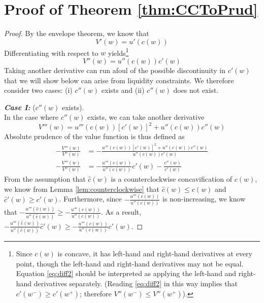 \documentclass[titlepage]{\econtex}
\begin{document}
\section{Proof of Theorem \ref{thm:CCToPrud}} \label{app:CCToPrud}
\begin{proof}
	By the envelope theorem, we know that 
	\[ V'(w) = u'(c(w))\]
	Differentiating with respect to $w$ yields\footnote{Since $c(w)$ is concave, it has left-hand and right-hand derivatives at every point, though the left-hand and right-hand derivatives may not be equal. Equation \eqref{eq:diff2} should be interpreted as applying the left-hand and right-hand derivatives separately. (Reading \eqref{eq:diff2} in this way implies that $c'(w^-) \geq c'(w^+)$; therefore $V''(w^-) \leq V''(w^+)$).}
	\begin{equation}\label{eq:diff2}
	V''(w) = u''(c(w))c'(w)
	\end{equation}
	Taking another derivative can run afoul of the possible discontinuity in $c'(w)$ that we will show below can arise from liquidity constraints. We therefore consider two cases: (i) $c''(w)$ exists and (ii) $c''(w)$ does not exist. 
	
	\bigskip
	\noindent \textbf{\textit{Case I:}} ($c''(w)$ exists).\\
	In the case where $c''(w)$ exists, we can take another derivative
	\[V'''(w) = u'''(c(w))[c'(w)]^2 + u''(c(w))c''(w)\]
	Absolute prudence of the value function is thus defined as
	\begin{align}-\frac{V'''(w)}{V''(w)} &= -\frac{u'''(c(w))[c'(w)]^2 + u''(c(w))c''(w)}{u''(c(w))c'(w)} \nonumber \\
	-\frac{V'''(w)}{V''(w)} &= -\frac{u'''(c(w))}{u''(c(w))}c'(w) - \frac{c''(w)}{c'(w)}\label{eq:absprudence}\end{align}
	From the assumption that $\hat{c}(w)$ is a counterclockwise concavification of $c(w)$, we know from Lemma \ref{lem:counterclockwise} that  $\hat{c}(w) \leq c(w)$ and $\hat{c}'(w) \geq c'(w)$. Furthermore, since $-\frac{u'''(c(w))}{u''(c(w))}$ is non-increasing, we know that $-\frac{u'''(\hat{c}(w))}{u''(\hat{c}(w))} \geq -\frac{u'''(c(w))}{u''(c(w))}$. As a result, $-\frac{u'''(\hat{c}(w))}{u''(\hat{c}(w))}\hat{c}'(w) \geq -\frac{u'''(c(w))}{u''(c(w))}c'(w)$. 
	

\end{proof}
\end{document}
